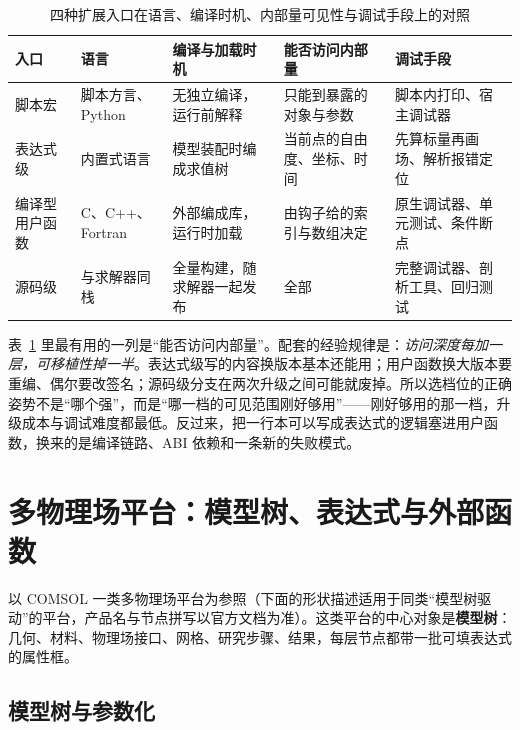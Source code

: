 \documentclass[12pt,a4paper,fontset=fandol]{ctexbook}
\newcommand{\Lang}[1]{\textsf{#1}}
\newcommand{\CL}{\Lang{C}}
\newcommand{\CPP}{\Lang{C++}}
\newcommand{\PY}{\Lang{Python}}
\begin{document}
\begin{table}[htbp]
\centering
{\small
\begin{tabular}{%
 >{\raggedright\arraybackslash}p{}
 >{\raggedright\arraybackslash}p{}
 >{\raggedright\arraybackslash}p{}
 >{\raggedright\arraybackslash}p{}
 >{\raggedright\arraybackslash}p{}}
\toprule
入口 & 语言 & 编译与加载时机 & 能否访问内部量 & 调试手段 \\
\midrule
脚本宏 & 脚本方言、\PY & 无独立编译，运行前解释 & 只能到暴露的对象与参数 & 脚本内打印、宿主调试器 \\
表达式级 & 内置式语言 & 模型装配时编成求值树 & 当前点的自由度、坐标、时间 & 先算标量再画场、解析报错定位 \\
编译型用户函数 & \CL、\CPP、Fortran & 外部编成库，运行时加载 & 由钩子给的索引与数组决定 & 原生调试器、单元测试、条件断点 \\
源码级 & 与求解器同栈 & 全量构建，随求解器一起发布 & 全部 & 完整调试器、剖析工具、回归测试 \\
\bottomrule
\end{tabular}
}
\caption{四种扩展入口在语言、编译时机、内部量可见性与调试手段上的对照}
\label{tab:ch07-lineage}
\end{table}

表~\ref{tab:ch07-lineage} 里最有用的一列是``能否访问内部量''。配套的经验规律是：\emph{访问深度每加一层，可移植性掉一半}。表达式级写的内容换版本基本还能用；用户函数换大版本要重编、偶尔要改签名；源码级分支在两次升级之间可能就废掉。所以选档位的正确姿势不是``哪个强''，而是``哪一档的可见范围刚好够用''——刚好够用的那一档，升级成本与调试难度都最低。反过来，把一行本可以写成表达式的逻辑塞进用户函数，换来的是编译链路、ABI 依赖和一条新的失败模式。

\section{多物理场平台：模型树、表达式与外部函数}
\label{sec:ch07-comsol-platform}

以 COMSOL 一类多物理场平台为参照（下面的形状描述适用于同类``模型树驱动''的平台，产品名与节点拼写以官方文档为准）。这类平台的中心对象是\textbf{模型树}：几何、材料、物理场接口、网格、研究步骤、结果，每层节点都带一批可填表达式的属性框。

\subsection*{模型树与参数化}
\end{document}
